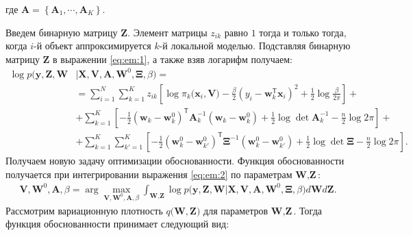  где $\mathbf{A} = \left\{\mathbf{A}_1, \cdots, \mathbf{A}_K\right\}.$
 
Введем бинарную матрицу $\mathbf{Z}$. Элемент матрицы $z_{ik}$ равно $1$ тогда и только тогда, когда $i$-й объект аппроксимируется $k$-й локальной моделью.
Подставляя бинарную матрицу $\mathbf{Z}$ в выражении \eqref{eq:em:1}, а также взяв логарифм получаем:
\[
\label{eq:em:2}
\begin{aligned}
\log p\bigr(\mathbf{y}, \mathbf{Z}, \mathbf{W}&|\mathbf{X}, \mathbf{V}, \textbf{A}, \textbf{W}^{0},  \bm{\Xi}, \beta\bigr) =\\
&= \sum_{i=1}^{N}\sum_{k=1}^{K}z_{ik}\left[\log\pi_k\bigr(\textbf{x}_i, \textbf{V}\bigr) - \frac{\beta}{2}\left(y_{i} - \textbf{w}_{k}^{\mathsf{T}}\textbf{x}_{i}\right)^{2} + \frac{1}{2}\log\frac{\beta}{2\pi}\right] +\\
&+ \sum_{k=1}^{K}\left[-\frac{1}{2}\left(\textbf{w}_{k} - \textbf{w}_{k}^{0}\right)^{\mathsf{T}}\textbf{A}_{k}^{-1}\left(\textbf{w}_{k} - \textbf{w}_{k}^{0}\right) + \frac{1}{2}\log\det\textbf{A}^{-1}_{k} - \frac{n}{2}\log2\pi\right]+\\
&+ \sum_{k=1}^{K}\sum_{k'=1}^{K}\left[-\frac{1}{2}\left(\textbf{w}_{k}^{0}-\textbf{w}_{k'}^{0}\right)^{\mathsf{T}}\bm{\Xi}^{-1}\left(\textbf{w}_{k}^{0}-\textbf{w}_{k'}^{0}\right) +\frac{1}{2}\log\det \bm{\Xi} -\frac{n}{2}\log{2\pi}\right].
\end{aligned}
\]
Получаем новую задачу оптимизации обоснованности. Функция обоснованности получается при интегрировании выражения \eqref{eq:em:2} по параметрам $\textbf{W}, \textbf{Z}$:
\[
\label{eq:em:3}
\begin{aligned}
\mathbf{V}, \mathbf{W}^0, \textbf{A},  \beta = \arg\max_{\mathbf{V}, \mathbf{W}^0, \textbf{A}, \beta} \int_{\textbf{W}, \textbf{Z}}\log p\bigr(\mathbf{y}, \textbf{Z}, \textbf{W}|\mathbf{X}, \mathbf{V}, \textbf{A}, \textbf{W}^{0}, \bm{\Xi}, \beta\bigr)d\textbf{W}d\textbf{Z}.
\end{aligned}
\]
Рассмотрим вариационную плотность $q\bigr(\textbf{W}, \textbf{Z}\bigr)$ для параметров $\textbf{W}, \textbf{Z}$. Тогда функция обоснованности принимает следующий вид:
